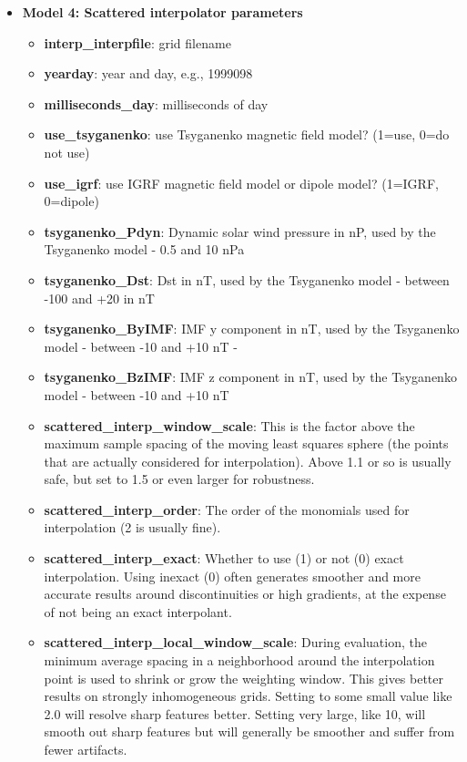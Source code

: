 \documentclass[10pt]{article}
\begin{document}
\begin{itemize}
  \item{\bf Model 4: Scattered interpolator parameters}
    \begin{itemize}
    \item{\bf interp\_interpfile}:
      grid filename
    \item{\bf yearday}:
      year and day, e.g., 1999098
    \item{\bf milliseconds\_day}:
      milliseconds of day
    \item{\bf use\_tsyganenko}:
      use Tsyganenko magnetic field model? (1=use, 0=do not use)
    \item{\bf use\_igrf}:
      use IGRF magnetic field model or dipole model? (1=IGRF, 0=dipole)
    \item{\bf tsyganenko\_Pdyn}:
      Dynamic solar wind pressure in nP, used by the Tsyganenko model
      - 0.5 and 10 nPa
    \item{\bf tsyganenko\_Dst}:
      Dst in nT, used by the Tsyganenko model - between -100 and +20 in nT
    \item{\bf tsyganenko\_ByIMF}:
      IMF y component in nT, used by the Tsyganenko model - between
      -10 and +10 nT -
    \item{\bf tsyganenko\_BzIMF}:
      IMF z component in nT, used by the Tsyganenko model - between
      -10 and +10 nT
    \item{\bf scattered\_interp\_window\_scale}: This is the factor
      above the maximum sample spacing of the moving least squares
      sphere (the points that are actually considered for
      interpolation).  Above 1.1 or so is usually safe, but set to 1.5
      or even larger for robustness.
    \item{\bf scattered\_interp\_order}:
      The order of the monomials used for interpolation (2 is usually fine).
    \item{\bf scattered\_interp\_exact}:
      Whether to use (1) or not (0) exact interpolation.  Using
      inexact (0) often generates smoother and more accurate results
      around discontinuities or high gradients, at the expense of not 
      being an exact interpolant.
    \item{\bf scattered\_interp\_local\_window\_scale}:
      During evaluation, the minimum average spacing in a neighborhood
      around the interpolation point is used to shrink or grow the
      weighting window.  This gives better results on strongly
      inhomogeneous grids.  Setting to some small value like 2.0 will
      resolve sharp features better.  Setting very large, like 10,
      will smooth out sharp features but will generally be smoother
      and suffer from fewer artifacts.
    \end{itemize}
\end{itemize}
\end{document}
